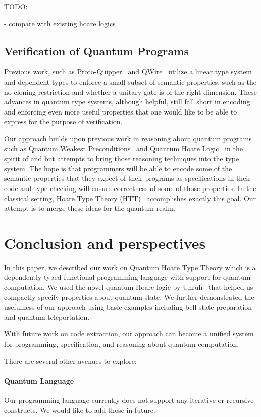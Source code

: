 \documentclass[adraft,creativecommons]{eptcs}
\theoremstyle{definition}
\theoremstyle{remark}
\begin{document}
TODO:

- compare with existing hoare logics

\subsection{Verification of Quantum Programs}
Previous work, such as Proto-Quipper~\cite{rios2017,rios2017} and QWire~\cite{qwire2017,qwirepractice2017,rand2018} utilize a linear type system and dependent types to enforce a small subset of semantic properties, such as the no-cloning restriction and whether a unitary gate is of the right dimension. These advances in quantum type systems, although helpful, still fall short in encoding and enforcing even more useful properties that one would like to be able to express for the purpose of verification.

Our approach builds upon previous work in reasoning about quantum programs such as Quantum Weakest Preconditions~\cite{dhondt2006} and Quantum Hoare Logic~\cite{floydhoare2012} in the spirit of \cite{hoare1969} and \cite{dijkstra1976} but attempts to bring those reasoning techniques into the type system. The hope is that programmers will be able to encode some of the semantic properties that they expect of their programs as specifications in their code and type checking will ensure correctness of some of those properties. In the classical setting, Hoare Type Theory (HTT)~\cite{nanevski2008} accomplishes exactly this goal. Our attempt is to merge these ideas for the quantum realm.

\section{Conclusion and perspectives}
\label{sec:conclusion}
In this paper, we described our work on Quantum Hoare Type Theory which is a dependently typed functional programming language with support for quantum computation. We used the novel quantum Hoare logic by Unruh~\cite{unruh2019} that helped us compactly specify properties about quantum state. We further demonstrated the usefulness of our approach using basic examples including bell state preparation and quantum teleportation.

With future work on code extraction, our approach can become a unified system for programming, specification, and reasoning about quantum computation.

There are several other avenues to explore:

\paragraph{Quantum Language} Our programming language currently does not support any iterative or recursive constructs. We would like to add those in future.
\end{document}
